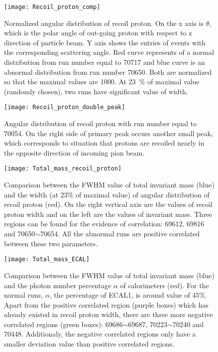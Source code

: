 \begin{figure}[!b]
	\centering
	\texttt{[image: Recoil\_proton\_comp]}
	\caption{Normalized angular distribution of recoil proton. On the x axis is $\theta$, which is the polar angle of out-going proton with respect to z direction of particle beam. Y axis shows the entries of events with the corresponding scattering angle. Red curve represents of a normal distribution from run number equal to 70717 and blue curve is an abnormal distribution from run number 70650. Both are normalized so that the maximal values are 1000. At \SI{23}{\percent} of maximal value (randomly chosen), two runs have significant value of width. }
	\label{fig:Recoil_proton_comp}
\end{figure}

\begin{figure}[!b]
	\centering
	\texttt{[image: Recoil\_proton\_double\_peak]}
	\caption{Angular distribution of recoil proton with run number equal to 70054. On the right side of primary peak occurs another small peak, which corresponds to situation that protons are recoiled nearly in the opposite direction of incoming pion beam. }
	\label{fig:Recoil_proton_double_peak}
\end{figure}

\begin{figure*}[!h]
	\centering
	\vspace{1cm}
	\texttt{[image: Total\_mass\_recoil\_proton]}
	\caption{Comparison between the FWHM value of total invariant mass (blue) and the width (at 23\% of maximal value) of angular distribution of recoil proton (red). On the right vertical axis are the values of recoil proton width and on the left are the values of invariant mass. Three regions can be found for the evidence of correlation: 69612, 69816 and 70650$\sim$70654. All the abnormal runs are positive correlated between these two parameters.}
	\label{fig:Total_mass_recoil_proton}
	\vspace{1 cm}
	
	\texttt{[image: Total\_mass\_ECAL]}
	\caption{Comparison between the FWHM value of total invariant mass (blue) and the photon number percentage $\alpha$ of calorimeters (red). For the normal runs, $\alpha$, the percentage of ECAL1, is around value of $45\%$. Apart from the positive correlated region (purple boxes) which has already existed in recoil proton width, there are three more negative correlated regions (green boxes): 69686$\sim$69687, 70223$\sim$70240 and 70448. Additionaly, the negative correlated regions only have a smaller deviation value than positive correlated regions.}
	\label{fig:Total_mass_ECAL}
	\vspace{1cm}
\end{figure*}

